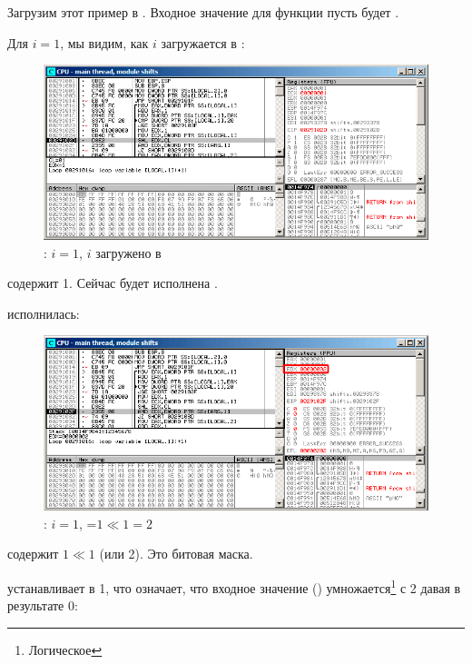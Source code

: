 ﻿\clearpage
\myparagraphold{\olly}
\myindex{\olly}

Загрузим этот пример в \olly. 
Входное значение для функции пусть будет .

Для $i=1$, мы видим, как $i$ загружается в \ECX: 

\begin{figure}[H]
\centering
\includegraphics[scale=\FigScale]{patterns/14_bitfields/4_popcnt/olly1_1.png}
\caption{\olly: $i=1$, $i$ загружено в \ECX}
\label{fig:shifts_olly1_1}
\end{figure}

\EDX содержит 1. Сейчас будет исполнена \SHL.

\clearpage
\SHL исполнилась:

\begin{figure}[H]
\centering
\includegraphics[scale=\FigScale]{patterns/14_bitfields/4_popcnt/olly1_2.png}
\caption{\olly: $i=1$, \EDX=$1 \ll 1=2$}
\label{fig:shifts_olly1_2}
\end{figure}

\EDX содержит $1 \ll 1$ (или 2). Это битовая маска.

\clearpage
\AND устанавливает \ZF в 1, 
что означает, что входное значение () 
умножается\footnote{Логическое } с 2 давая в результате 0:

